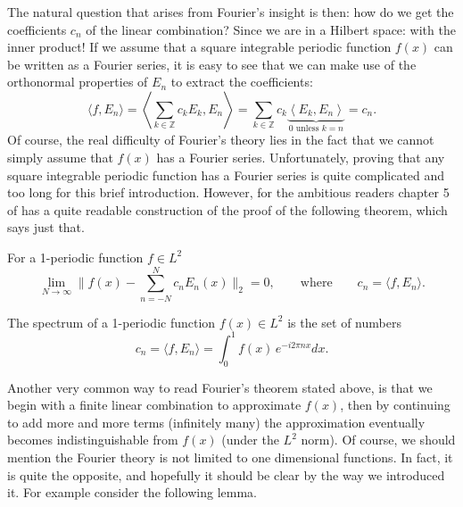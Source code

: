 The natural question that arises from Fourier's insight is then: how do we get
the coefficients $c_n$ of the linear combination? Since we are in a Hilbert
space: with the inner product! If we assume that a square integrable periodic
function $f(x)$ can be written as a Fourier series, it is easy to see that we
can make use of the orthonormal properties of $E_n$ to extract the
coefficients:
\begin{equation*}
  \langle f, E_n \rangle
    = \left \langle \sum_{k \in\mathbb{Z}} c_k E_k , E_n \right \rangle
    = \sum_{k \in\mathbb{Z}}  c_k \underbrace{
      \left \langle E_k , E_n \right \rangle
    }_{ 0 \text{ unless } k = n}
    = c_n.
\end{equation*}
Of course, the real difficulty of Fourier's theory lies in the fact that we
cannot simply assume that $f(x)$ has a Fourier series. Unfortunately, proving
that any square integrable periodic function has a Fourier series is quite
complicated and too long for this brief introduction. However, for the
ambitious readers chapter 5 of \cite{tao_analysis_2016} has a quite readable
construction of the proof of the following theorem, which says just that.

\begin{theorem}
  \label{kugel:thm:fourier-theorem}
  For a 1-periodic function $f \in L^2$
  \begin{equation*}
    \lim_{N \to \infty} \biggl \|
      f(x) - \sum_{n = -N}^N c_n E_n(x) 
    \biggr \|_2 = 0,
    \qquad\text{where}\qquad
    c_n = \langle f, E_n \rangle.
  \end{equation*}
\end{theorem}

\begin{definition}[Spectrum]
  The spectrum of a 1-periodic function $f(x) \in L^2$ is the set of numbers
  \begin{equation*}
    c_n = \langle f, E_n \rangle
      = \int_0^1 f(x) \, e^{-i2\pi nx} dx.
  \end{equation*}
\end{definition}
\fi

Another very common way to read Fourier's theorem stated above, is that we
begin with a finite linear combination to approximate $f(x)$, then by
continuing to add more and more terms (infinitely many) the approximation
eventually becomes indistinguishable from $f(x)$ (under the $L^2$ norm). Of
course, we should mention the Fourier theory is not limited to one dimensional
functions.  In fact, it is quite the opposite, and hopefully it should be
clear by the way we introduced it. For example consider the following lemma.

